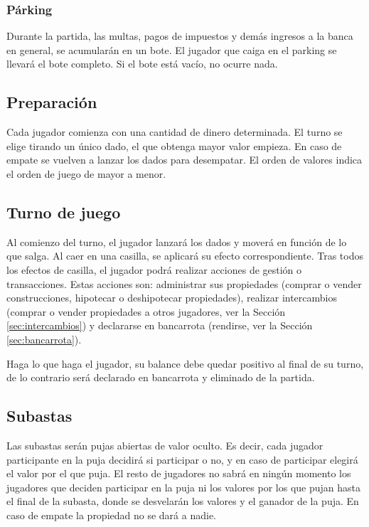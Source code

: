 \subsubsection{Párking}
Durante la partida, las multas, pagos de impuestos y demás ingresos 
a la banca en general,
se acumularán en un bote. El jugador que caiga en el parking se llevará
el bote completo. Si el bote está vacío, no ocurre nada.

\subsection{Preparación}
Cada jugador comienza con una cantidad de dinero determinada.
El turno se elige tirando un único dado, el que obtenga mayor valor empieza.
En caso de empate se vuelven a lanzar los dados para desempatar.
El orden de valores indica el orden de juego
de mayor a menor.


\subsection{Turno de juego}
Al comienzo del turno, el jugador lanzará los dados y moverá en función de lo 
que salga. Al caer en una casilla, se aplicará su efecto correspondiente.
Tras todos los efectos de casilla, el jugador podrá realizar acciones de 
gestión o transacciones. Estas acciones son: administrar sus propiedades 
(comprar o vender construcciones, hipotecar o deshipotecar propiedades), 
realizar intercambios (comprar o vender propiedades a otros jugadores, 
ver la Sección \ref{sec:intercambios}) y declararse en bancarrota 
(rendirse, ver la Sección \ref{sec:bancarrota}).

Haga lo que haga el jugador, su balance debe quedar positivo al final de su turno,
de lo contrario será declarado en bancarrota y eliminado de la partida.

\subsection{Subastas}
Las subastas serán pujas abiertas de valor oculto. Es decir, cada jugador
participante en la puja decidirá si participar o no, y en caso de participar
elegirá el valor por el que puja. El resto de jugadores no sabrá en ningún 
momento los jugadores que deciden participar en la puja ni los valores por los 
que pujan hasta el final de la subasta, donde se desvelarán los valores y 
el ganador de la puja. En caso de empate la propiedad no se dará a nadie.

